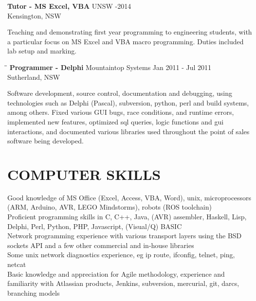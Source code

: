 \documentclass{res}
\begin{document}
\begin{resume}
\begin{tabbing}
    {\bf Tutor - MS Excel, VBA} \>UNSW     -2014\\
                                \>Kensington, NSW
   \end{tabbing}\vspace{-20pt}      %
    Teaching and demonstrating first year programming to engineering students,
    with a particular focus on MS Excel and VBA macro programming. Duties
    included lab setup and marking.
   \begin{tabbing}
   \hspace{2.3in}\= \hspace{2.6in}\= \kill %
    {\bf Programmer - Delphi} \>Mountaintop Systems \> Jan 2011 - Jul 2011\\
                              \>Sutherland, NSW
   \end{tabbing}\vspace{-20pt}
    Software development, source control, documentation and debugging,
    using technologies such as Delphi (Pascal), subversion, python, perl and
    build systems, among others. Fixed various GUI bugs, race conditions, and
    runtime errors, implemented new features, optimized sql queries, logic
    functions and gui interactions, and documented various libraries used
    throughout the point of sales software being developed.


\section{COMPUTER SKILLS}          
    Good knowledge of MS Office (Excel, Access, VBA, Word), unix, microprocessors (ARM, Arduino, AVR, LEGO Mindstorms), robots (ROS toolchain) \\
    Proficient programming skills in C, C++, Java, (AVR) assembler, Haskell, Lisp, Delphi, Perl, Python, PHP, Javascript, (Visual/Q) BASIC \\
    Network programming experience with various transport layers using the BSD sockets API and a few other commercial and in-house libraries \\
    Some unix network diagnostics experience, eg ip route, ifconfig, telnet, ping, netcat \\
    Basic knowledge and appreciation for Agile methodology, experience and familiarity with Atlassian products, Jenkins, subversion, mercurial, git, darcs, branching models
 
 

\end{resume}
\end{document}
